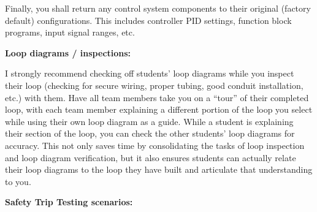 \begin{itemize}
\vskip 10pt

Finally, you shall return any control system components to their original (factory default) configurations.  This includes controller PID settings, function block programs, input signal ranges, etc.















\noindent
{\bf Loop diagrams / inspections:}

I strongly recommend checking off students' loop diagrams while you inspect their loop (checking for secure wiring, proper tubing, good conduit installation, etc.) with them.  Have all team members take you on a ``tour'' of their completed loop, with each team member explaining a different portion of the loop you select while using their own loop diagram as a guide.  While a student is explaining their section of the loop, you can check the other students' loop diagrams for accuracy.  This not only saves time by consolidating the tasks of loop inspection and loop diagram verification, but it also ensures students can actually relate their loop diagrams to the loop they have built and articulate that understanding to you.

\vskip 10pt

\goodbreak

\noindent
{\bf Safety Trip Testing scenarios:}


\end{itemize}
